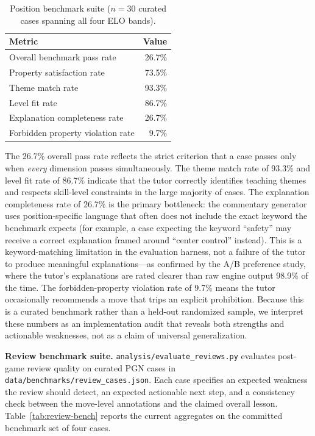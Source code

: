 \documentclass[11pt]{article}
\begin{document}
\begin{table}[h]
\centering
\caption{Position benchmark suite ($n=30$ curated cases spanning all four ELO bands).}
\label{tab:position-bench}
\begin{tabular}{@{}lr@{}}
\toprule
Metric & Value \\
\midrule
Overall benchmark pass rate            & 26.7\% \\
Property satisfaction rate             & 73.5\% \\
Theme match rate                       & 93.3\% \\
Level fit rate                         & 86.7\% \\
Explanation completeness rate          & 26.7\% \\
Forbidden property violation rate      & 9.7\% \\
\bottomrule
\end{tabular}
\end{table}

The 26.7\% overall pass rate reflects the strict criterion that a case passes only when \emph{every} dimension passes simultaneously. The theme match rate of 93.3\% and level fit rate of 86.7\% indicate that the tutor correctly identifies teaching themes and respects skill-level constraints in the large majority of cases. The explanation completeness rate of 26.7\% is the primary bottleneck: the commentary generator uses position-specific language that often does not include the exact keyword the benchmark expects (for example, a case expecting the keyword ``safety'' may receive a correct explanation framed around ``center control'' instead). This is a keyword-matching limitation in the evaluation harness, not a failure of the tutor to produce meaningful explanations---as confirmed by the A/B preference study, where the tutor's explanations are rated clearer than raw engine output 98.9\% of the time. The forbidden-property violation rate of 9.7\% means the tutor occasionally recommends a move that trips an explicit prohibition. Because this is a curated benchmark rather than a held-out randomized sample, we interpret these numbers as an implementation audit that reveals both strengths and actionable weaknesses, not as a claim of universal generalization.


\textbf{Review benchmark suite.} \texttt{analysis/evaluate\_reviews.py} evaluates post-game review quality on curated PGN cases in \texttt{data/benchmarks/review\_cases.json}. Each case specifies an expected weakness the review should detect, an expected actionable next step, and a consistency check between the move-level annotations and the claimed overall lesson. Table~\ref{tab:review-bench} reports the current aggregates on the committed benchmark set of four cases.
\end{document}
